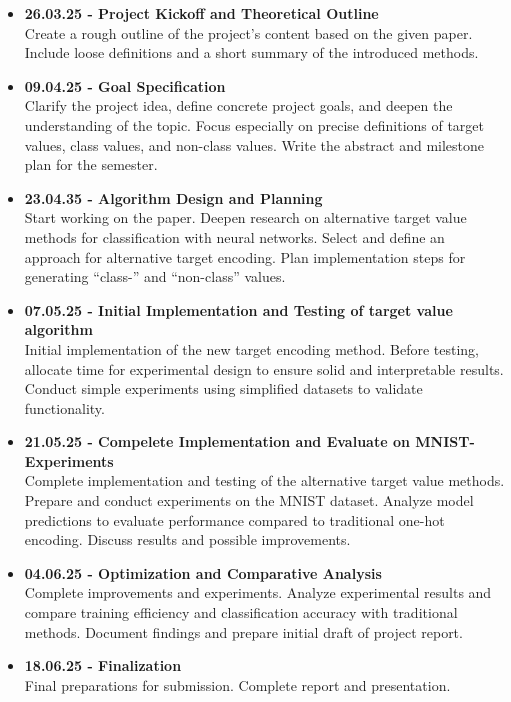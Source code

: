 \documentclass[12pt,fleqn,a4paper]{article}
\begin{document}
\begin{itemize}
\item {\textbf{26.03.25 - Project Kickoff and Theoretical Outline} \\ Create a rough outline of the project's content based on the given paper. Include loose definitions and a short summary of the introduced methods.}

\item{\textbf{09.04.25 - Goal Specification} \\ Clarify the project idea, define concrete project goals, and deepen the understanding of the topic. Focus especially on precise definitions of target values, class values, and non-class values. Write the abstract and milestone plan for the semester.}

\item{\textbf{23.04.35 - Algorithm Design and Planning} \\ Start working on the paper. Deepen research on alternative target value methods for classification with neural networks. Select and define an approach for alternative target encoding. Plan implementation steps for generating ``class-'' and ``non-class'' values.}

\item{\textbf{07.05.25 - Initial Implementation and Testing of target value algorithm} \\ Initial implementation of the new target encoding method.  Before testing, allocate time for experimental design to ensure solid and interpretable results. Conduct simple experiments using simplified datasets to validate functionality.}

\item{\textbf{21.05.25 - Compelete Implementation and Evaluate on MNIST-Experiments} \\ Complete implementation and testing of the alternative target value methods. Prepare and conduct experiments on the MNIST dataset. Analyze model predictions to evaluate performance compared to traditional one-hot encoding. Discuss results and possible improvements.}

\item{\textbf{04.06.25 - Optimization and Comparative Analysis} \\ Complete improvements and experiments. Analyze experimental results and compare training efficiency and classification accuracy with traditional methods. Document findings and prepare initial draft of project report.}

\item{\textbf{18.06.25 - Finalization} \\ Final preparations for submission. Complete report and presentation.}

\end{itemize}
\end{document}
